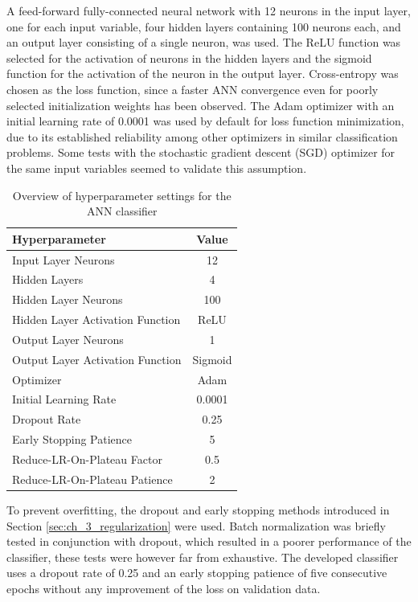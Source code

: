 A feed-forward fully-connected neural network with 12 neurons in the input layer, one for each input variable, four hidden layers containing 100 neurons each, and an output layer consisting of a single neuron, was used. The ReLU function was selected for the activation of neurons in the hidden layers and the sigmoid function for the activation of the neuron in the output layer. Cross-entropy was chosen as the loss function, since a faster ANN convergence even for poorly selected initialization weights has been observed. The Adam optimizer with an initial learning rate of 0.0001 was used by default for loss function minimization, due to its established reliability among other optimizers in similar classification problems. Some tests with the stochastic gradient descent (SGD) optimizer for the same input variables seemed to validate this assumption.

\begin{table}[h]
    \caption{Overview of hyperparameter settings for the ANN classifier}
    \label{tab:ch_4_ann_topology}
    \begin{center}
        \begin{tabular}{lc}
            \hline
            Hyperparameter & Value\\
            \hline
            Input Layer Neurons & 12\\
            Hidden Layers & 4\\
            Hidden Layer Neurons & 100\\
            Hidden Layer Activation Function & ReLU\\
            Output Layer Neurons & 1\\
            Output Layer Activation Function & Sigmoid\\
            Optimizer & Adam\\
            Initial Learning Rate & 0.0001\\
            Dropout Rate & 0.25\\
            Early Stopping Patience & 5\\
            Reduce-LR-On-Plateau Factor & 0.5\\
            Reduce-LR-On-Plateau Patience & 2\\
            \hline
        \end{tabular}
    \end{center}
\end{table}

To prevent overfitting, the dropout and early stopping methods introduced in Section \ref{sec:ch_3_regularization} were used. Batch normalization was briefly tested in conjunction with dropout, which resulted in a poorer performance of the classifier, these tests were however far from exhaustive. The developed classifier uses a dropout rate of 0.25 and an early stopping patience of five consecutive epochs without any improvement of the loss on validation data.


